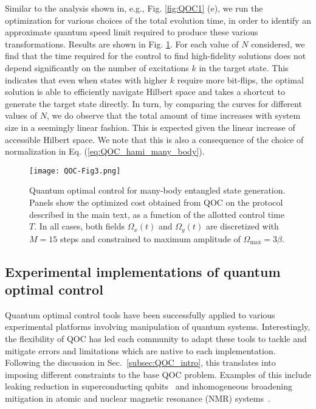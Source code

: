 Similar to the analysis shown in, e.g., Fig. \ref{fig:QOC1} (e), we run the optimization for various choices of the total evolution time, in order to identify an approximate quantum speed limit required to produce these various transformations. Results are shown in Fig. \ref{fig:QOC3}. For each value of $N$ considered, we find that the time required for the control to find high-fidelity solutions does not depend significantly on the number of excitations $k$ in the target state. This indicates that even when states with higher $k$ require more bit-flips, the optimal solution is able to efficiently navigate Hilbert space and takes a shortcut to generate the target state directly. In turn, by comparing the curves for different values of $N$, we do observe that the total amount of time increases with system size in a seemingly linear fashion. This is expected given the linear increase of accessible Hilbert space. We note that this is also a consequence of the choice of normalization in Eq. (\ref{eq:QOC_hami_many_body}).

\begin{figure}[t]
\texttt{[image: QOC-Fig3.png]}
\caption{Quantum optimal control for many-body entangled state generation. Panels show the optimized cost obtained from QOC on the protocol described in the main text, as a function of the allotted control time $T$. In all cases, both fields $\Omega_x(t)$ and $\Omega_y(t)$ are discretized with $M=15$ steps and constrained to maximum amplitude of $\Omega_{\mathrm{max}}=3\beta$.} 
\label{fig:QOC3}
\end{figure}


\subsection{Experimental implementations of quantum optimal control}
Quantum optimal control tools have been successfully applied to various experimental platforms involving manipulation of quantum systems. Interestingly, the flexibility of QOC has led each community to adapt these tools to tackle and mitigate errors and limitations which are native to each implementation. Following the discussion in Sec.~\ref{subsec:QOC_intro}, this translates into imposing different constraints to the base QOC problem. Examples of this include leaking reduction in superconducting qubits~\cite{motzoi2009} and inhomogeneous broadening mitigation in atomic and nuclear magnetic resonance (NMR) systems~\cite{ruths2012}.


